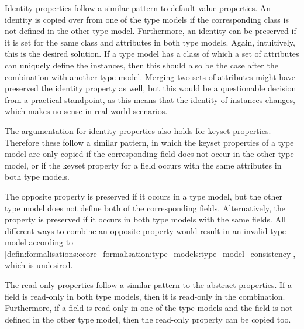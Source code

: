 Identity properties follow a similar pattern to default value properties. An identity is copied over from one of the type models if the corresponding class is not defined in the other type model. Furthermore, an identity can be preserved if it is set for the same class and attributes in both type models. Again, intuitively, this is the desired solution. If a type model has a class of which a set of attributes can uniquely define the instances, then this should also be the case after the combination with another type model. Merging two sets of attributes might have preserved the identity property as well, but this would be a questionable decision from a practical standpoint, as this means that the identity of instances changes, which makes no sense in real-world scenarios.

The argumentation for identity properties also holds for keyset properties. Therefore these follow a similar pattern, in which the keyset properties of a type model are only copied if the corresponding field does not occur in the other type model, or if the keyset property for a field occurs with the same attributes in both type models.

The opposite property is preserved if it occurs in a type model, but the other type model does not define both of the corresponding fields. Alternatively, the property is preserved if it occurs in both type models with the same fields. All different ways to combine an opposite property would result in an invalid type model according to \cref{defin:formalisations:ecore_formalisation:type_models:type_model_consistency}, which is undesired.

The read-only properties follow a similar pattern to the abstract properties. If a field is read-only in both type models, then it is read-only in the combination. Furthermore, if a field is read-only in one of the type models and the field is not defined in the other type model, then the read-only property can be copied too.

